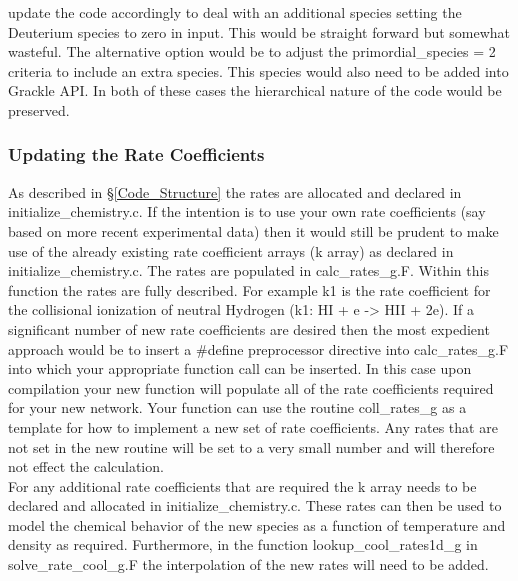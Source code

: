 update the code accordingly to deal with an additional species setting the Deuterium species to zero in input.
This would be straight forward but somewhat wasteful. The alternative option would be to adjust the 
primordial\_species = 2 criteria to include an extra species. This species would also need to be added into
Grackle API. In both of these cases the hierarchical nature of the code would be preserved. \\

\subsubsection{Updating the Rate Coefficients}
As described in \S \ref{Code_Structure} the rates are allocated and declared in initialize\_chemistry.c. If the
intention is to use your own rate coefficients (say based on more recent experimental data) then 
it would still be prudent to make use of the already existing rate coefficient arrays (k array) as declared
in initialize\_chemistry.c. The rates are populated in calc\_rates\_g.F. Within this function the rates 
are fully described. For example k1 is the rate coefficient for the collisional ionization of neutral 
Hydrogen (k1: HI + e -> HII + 2e). If a significant number of new rate coefficients are desired then 
the most expedient approach would be to insert a \#define preprocessor directive into calc\_rates\_g.F
into which your appropriate function call can be inserted. In this case upon compilation your new function 
will populate all of the rate coefficients required for your new network. Your function can use the 
routine coll\_rates\_g as a template for how to implement a new set of rate coefficients. Any rates that are not
set in the new routine will be set to a very small number and will therefore not effect the calculation.\\
\indent For any additional rate coefficients that are required the k array needs to be declared and allocated
in initialize\_chemistry.c. These rates can then be used to model the chemical behavior of the new species
as a function of temperature and density as required. Furthermore, in the function lookup\_cool\_rates1d\_g 
in solve\_rate\_cool\_g.F the interpolation of the new rates will need to be added. 


